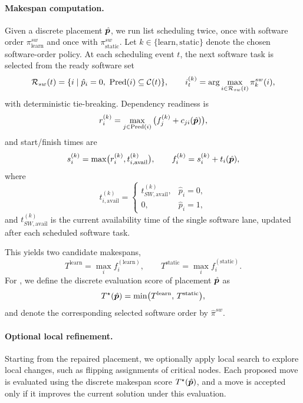 \paragraph{\textbf{Makespan computation.}}
Given a discrete placement $\hat{{\bm{p}}}$, we run list scheduling twice, once with software order $\pi_{\mathrm{learn}}^{sw}$ and once with $\pi_{\mathrm{static}}^{sw}$. Let $k \in \{\mathrm{learn},\mathrm{static}\}$ denote the chosen software-order policy. At each scheduling event $t$, the next software task is selected from the ready software set
\begin{equation}
\mathcal{R}_{sw}(t)=\{i\mid \hat{p}_i=0,\ \Pred(i)\subseteq \mathcal{C}(t)\},
\qquad
i_t^{(k)}=\arg\max_{i\in\mathcal{R}_{sw}(t)} \pi_k^{sw}(i),
\end{equation}
with deterministic tie-breaking. Dependency readiness is
\begin{equation}
r_i^{(k)}=\max_{j\in\operatorname{Pred}(i)}\big(f_j^{(k)}+c_{ji}(\hat{{\bm{p}}})\big),
\end{equation}
and start/finish times are
\begin{equation}
s_i^{(k)}=\max\!\big(r_i^{(k)},t_{i,\mathrm{avail}}^{(k)}\big),
\qquad
f_i^{(k)}=s_i^{(k)}+t_i(\hat{{\bm{p}}}),
\end{equation}
where
\begin{equation}
t_{i,\mathrm{avail}}^{(k)}=
\begin{cases}
t_{SW,\mathrm{avail}}^{(k)}, & \hat{p}_i=0,\\
0, & \hat{p}_i=1,
\end{cases}
\end{equation}
and $t_{SW,\mathrm{avail}}^{(k)}$ is the current availability time of the single software lane, updated after each scheduled software task.

This yields two candidate makespans,
\begin{equation}
T^{\mathrm{learn}}=\max_i f_i^{(\mathrm{learn})},
\qquad
T^{\mathrm{static}}=\max_i f_i^{(\mathrm{static})}.
\end{equation}
For \diffgnn, we define the discrete evaluation score of placement $\hat{{\bm{p}}}$ as
\begin{equation}
T^\star(\hat{{\bm{p}}})
=
\min\!\big(T^{\mathrm{learn}},\,T^{\mathrm{static}}\big),
\label{eq:best_of_two_orders}
\end{equation}
and denote the corresponding selected software order by $\hat{\pi}^{sw}$.

\paragraph{\textbf{Optional local refinement.}}
Starting from the repaired placement, we optionally apply local search to explore local changes, such as flipping assignments of critical nodes. Each proposed move is evaluated using the discrete makespan score $T^\star(\hat{{\bm{p}}})$, and a move is accepted only if it improves the current solution under this evaluation.


